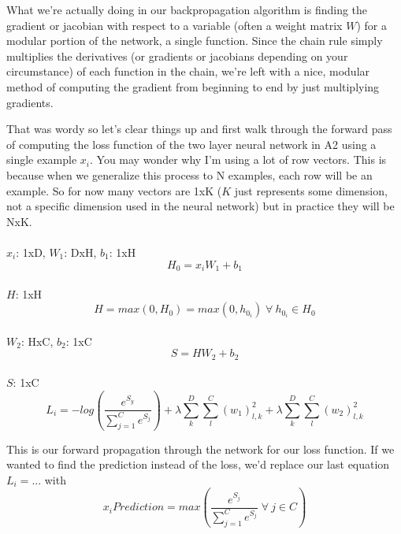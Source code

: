 \documentclass[12pt]{article}
\begin{document}
What we're actually doing in our backpropagation algorithm is finding the 
gradient or jacobian with respect to a variable (often a weight matrix $W$) for a modular portion
of the network, a single function. Since the chain rule simply multiplies the derivatives (or gradients or jacobians 
depending on your circumstance) of each function in the chain, we're left with a nice, modular 
method of computing the gradient from beginning to end by just multiplying gradients. 

That was wordy so let's clear things up and first walk through the forward pass of computing the 
loss function of the two layer neural network in A2 using a single 
example $x_i$. You may wonder why I'm using a lot of row vectors. This is because when we generalize 
this process to N examples, each row will be an example. So for now many vectors are 1xK ($K$ just represents some
dimension, not a specific dimension used in the neural network) but in practice they will be NxK.

\paragraph{}$x_i$: 1xD, $W_1$: DxH, $b_1$: 1xH
\begin{equation}
    H_0 = x_iW_1 + b_1
\end{equation}
\paragraph{}$H$: 1xH
\begin{equation}
    H = max(0, H_0) = max(0, h_{0_i}) \;\forall \:h_{0_i} \in H_0
\end{equation}
\paragraph{}$W_2$: HxC, $b_2$: 1xC
\begin{equation}
    S = HW_2 + b_2
\end{equation}
\paragraph{}$S$: 1xC
\begin{equation}
    L_i = - log(\frac{e^{S_y}}{{\sum_{j=1}^C} e^{S_j}}) + 
    \lambda \sum_{k}^D \sum_{l}^C (w_1)_{l, k}^2 + 
    \lambda \sum_{k}^D \sum_{l}^C (w_2)_{l, k}^2
\end{equation}

This is our forward propagation through the network for our loss function. 
If we wanted to find the prediction instead of the loss, 
we'd replace our last equation $L_i = ...$ with 
\begin{equation}
    x_i Prediction = max(\frac{e^{S_j}}{{\sum_{j=1}^C} e^{S_j}} \;\forall \: j \in C )
\end{equation}
\end{document}
